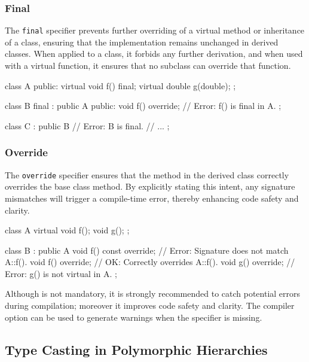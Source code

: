 \subsubsection{Final}

The \texttt{final} specifier prevents further overriding of a virtual method or inheritance of a class, ensuring that the implementation remains unchanged in derived classes. When applied to a class, it forbids any further derivation, and when used with a virtual function, it ensures that no subclass can override that function.

\begin{codeblock}[language=C++]
class A {
public:
    virtual void f() final;
    virtual double g(double);
};

class B final : public A {
public:
    void f() override; // Error: f() is final in A.
};

class C : public B // Error: B is final.
{
// ...
};
\end{codeblock}

\subsubsection{Override}

The \texttt{override} specifier ensures that the method in the derived class correctly overrides the base class method. By explicitly stating this intent, any signature mismatches will trigger a compile-time error, thereby enhancing code safety and clarity.

\begin{codeblock}[language=C++]
class A {
    virtual void f();
    void g();
};

class B : public A {
    void f() const override; // Error: Signature does not match A::f().
    void f() override; // OK: Correctly overrides A::f().
    void g() override; // Error: g() is not virtual in A.
};
\end{codeblock}

\begin{tipsblock}
Although  is not mandatory, it is strongly recommended to catch potential errors during compilation; moreover it improves code safety and clarity.
\vspace{0.5em}
The compiler option  can be used to generate warnings when the  specifier is missing.
\end{tipsblock}

\subsection{Type Casting in Polymorphic Hierarchies}

